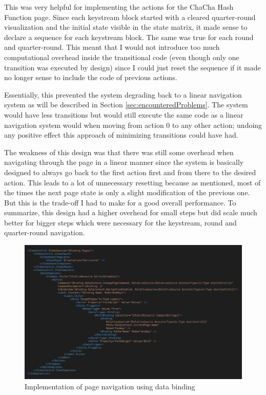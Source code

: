 This was very helpful for implementing the actions for the ChaCha Hash Function page. Since each keystream block started with a cleared quarter-round visualization and the initial state visible in the state matrix, it made sense to declare a sequence for each keystream block. The same was true for each round and quarter-round. This meant that I would not introduce too much computational overhead inside the transitional code (even though only one transition was executed by design) since I could just reset the sequence if it made no longer sense to include the code of previous actions.

Essentially, this prevented the system degrading back to a linear navigation system as will be described in Section \ref{sec:encounteredProblems}. The system would have less transitions but would still execute the same code as a linear navigation system would when moving from action 0 to any other action; undoing any positive effect this approach of minimizing transitions could have had.

The weakness of this design was that there was still some overhead when navigating through the page in a linear manner since the system is basically designed to always go back to the first action first and from there to the desired action. This leads to a lot of unnecessary resetting because as mentioned, most of the times the next page state is only a slight modification of the previous one. But this is the trade-off I had to make for a good overall performance. To summarize, this design had a higher overhead for small steps but did scale much better for bigger steps which were necessary for the keystream, round and quarter-round navigation. 

\begin{figure}[h]
\centering
\includegraphics[width=\textwidth]{figures/code/mvvm-arch/page-navigation-template.png}
\caption[Page navigation]{Implementation of page navigation using data binding}
\label{fig:mvvm.pagenavigation}
\end{figure}

